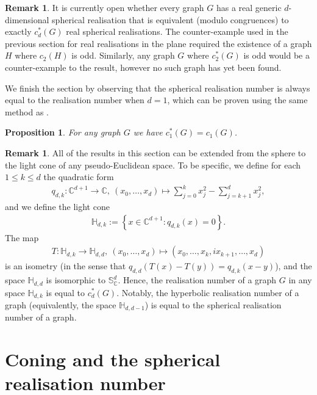 \documentclass[11pt]{article}
\newtheorem{proposition}[theo]{Proposition}
\theoremstyle{definition}
\newtheorem{remark}[theo]{Remark}
\numberwithin{equation}{section}
\begin{document}
\begin{remark}
	It is currently open whether every graph $G$ has a real generic $d$-dimensional spherical realisation that is equivalent (modulo congruences) to exactly $c_d^*(G)$ real spherical realisations.
	The counter-example used in the previous section for real realisations in the plane required the existence of a graph $H$ where $c_2(H)$ is odd.
	Similarly, any graph $G$ where $c^*_2(G)$ is odd would be a counter-example to the result, however no such graph has yet been found.
\end{remark}

We finish the section by observing that the spherical realisation number is always equal to the realisation number when $d=1$,
which can be proven using the same method as .

\begin{proposition}\label{p:1dsame}
	For any graph $G$ we have $c_1^*(G) =c_1(G)$.
\end{proposition}

\begin{remark}\label{rem:hyperbolic}
	All of the results in this section can be extended from the sphere to the light cone of any pseudo-Euclidean space.
	To be specific,
	we define for each $1 \leq k \leq d$ the quadratic form
	\begin{align*}
		q_{d,k}: \mathbb{C}^{d+1} \rightarrow \mathbb{C}, ~ (x_0,\ldots,x_{d}) \mapsto \sum_{j=0}^k x_j^2 - \sum_{j=k+1}^d x_j^2,
	\end{align*}
	and we define the light cone
	\begin{align*}
		\mathbb{H}_{d,k} := \left\{ x \in \mathbb{C}^{d+1} : q_{d,k}(x) = 0 \right\}.
	\end{align*}
	The map
	\begin{align*}
		T:\mathbb{H}_{d,k} \rightarrow \mathbb{H}_{d,d}, ~ (x_0,\ldots,x_d) \mapsto (x_0,\ldots, x_k, ix_{k+1},\ldots,x_d)
	\end{align*}
	is an isometry (in the sense that $q_{d,d}(T(x) - T(y)) = q_{d,k}(x-y)$),
	and the space $\mathbb{H}_{d,d}$ is isomorphic to $\mathbb{S}_{\mathbb{C}}^d$.
	Hence, the realisation number of a graph $G$ in any space $\mathbb{H}_{d,k}$ is equal to $c^*_d(G)$.
	Notably,
	the hyperbolic realisation number of a graph (equivalently, the space $\mathbb{H}_{d,d-1}$) is equal to the spherical realisation number of a graph. 
\end{remark}



\section{Coning and the spherical realisation number}\label{sec:cone}
\end{document}
